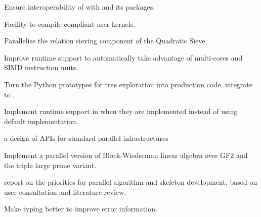 \begin{workpackage}
\begin{tasklist}
\end{tasklist}
\begin{wpdelivs}
  \begin{wpdeliv}[due=1,id=pythran,dissem=PU,nature=R]
      {Ensure interoperability of \Pythran with \Python and its packages.}
\end{wpdeliv}
  \begin{wpdeliv}[due=2,id=pythran-sage,dissem=PU,nature=DEM]
      {Facility to compile \Pythran compliant user kernels.}
\end{wpdeliv}
  \begin{wpdeliv}[due=3,id=QS-sieving,dissem=PU,nature=DEM]
      {Parallelise the relation sieving component of the Quadratic Sieve}
\end{wpdeliv}
  \begin{wpdeliv}[due=3,id=pythran-runtime,dissem=PU,nature=DEM]
      {Improve \Pythran runtime support to automatically take advantage of multi-cores and SIMD instruction units.}
\end{wpdeliv}
  \begin{wpdeliv}[due=3,id=HPCcombi,dissem=PU,nature=DEM]
      {Turn the Python prototypes for tree exploration into    production code, integrate to \Sage.}
\end{wpdeliv}
  \begin{wpdeliv}[due=6,id=pythran-cython,dissem=PU,nature=DEM]
      {Implement \Pythran runtime support in \Cython when they are implemented instead of using default implementation.}
\end{wpdeliv}
  \begin{wpdeliv}[due=6,id=GAP-APIs,dissem=public,nature=report]
      { a design of \GAP APIs for standard parallel infrastructures}
\end{wpdeliv}
  \begin{wpdeliv}[due=9,id=QS-linalg,dissem=PU,nature=DEM]
      {Implement a parallel version of Block-Wiederman linear algebra over GF2 and the triple large prime variant.}
\end{wpdeliv}

  \begin{wpdeliv}[due=12,id=GAP-lib-plan,dissem=public,nature=report]
    {report on the priorities for parallel algorithm and skeleton development, based on
      user consultation and literature review.}
  \end{wpdeliv}
  \begin{wpdeliv}[due=12,id=pythran-typing,dissem=PU,nature=DEM]
      {Make \Pythran typing better to improve error information.}
\end{wpdeliv}



\end{wpdelivs}
\end{workpackage}
